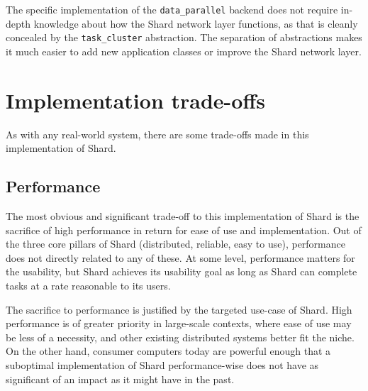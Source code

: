 \documentclass[oneside]{report}
\newcommand{\todoi}[1]{\todo[inline, color=blue!20]{TODO: {#1}}}
\begin{document}
\begin{sloppypar}
  The specific implementation of the \texttt{data\_parallel} backend does not require in-depth knowledge about how the Shard network layer functions, as that is cleanly concealed by the \texttt{task\_cluster} abstraction.
  The separation of abstractions makes it much easier to add new application classes or improve the Shard network layer.
\end{sloppypar}

\section{Implementation trade-offs}

As with any real-world system, there are some trade-offs made in this implementation of Shard.

\subsection{Performance}

The most obvious and significant trade-off to this implementation of Shard is the sacrifice of high performance in return for ease of use and implementation.
Out of the three core pillars of Shard (distributed, reliable, easy to use), performance does not directly related to any of these.
At some level, performance matters for the usability, but Shard achieves its usability goal as long as Shard can complete tasks at a rate reasonable to its users.

The sacrifice to performance is justified by the targeted use-case of Shard.
High performance is of greater priority in large-scale contexts, where ease of use may be less of a necessity, and other existing distributed systems better fit the niche.
On the other hand, consumer computers today are powerful enough that a suboptimal implementation of Shard performance-wise does not have as significant of an impact as it might have in the past.
\end{document}
